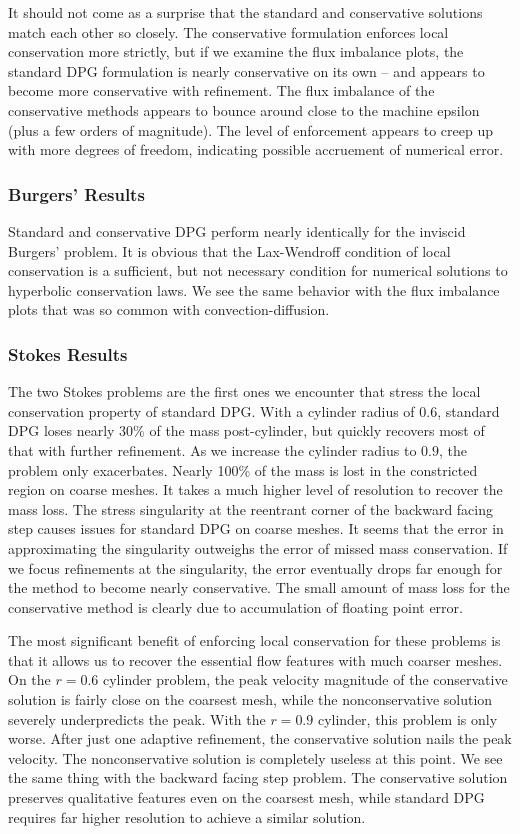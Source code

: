 \documentclass[Proposal.tex]{subfiles}
\begin{document}
It should not come as a surprise that the standard and conservative
solutions match each other so closely. The conservative formulation
enforces local conservation more strictly, but if we examine the flux
imbalance plots, the standard DPG formulation is nearly conservative on its
own -- and appears to become more conservative with refinement. The flux
imbalance of the conservative methods appears to bounce around close to the
machine epsilon (plus a few orders of magnitude). The level of enforcement
appears to creep up with more degrees of freedom, indicating possible
accruement of numerical error.

\subsubsection{Burgers' Results}
Standard and conservative DPG perform nearly identically for the
inviscid Burgers' problem. It is obvious that the Lax-Wendroff condition of
local conservation is a sufficient, but not necessary condition for numerical
solutions to hyperbolic conservation laws. We see the same behavior with the
flux imbalance plots that was so common with convection-diffusion.

\subsubsection{Stokes Results}
The two Stokes problems are the first ones we encounter that stress the local
conservation property of standard DPG. With a cylinder radius of $0.6$,
standard DPG loses nearly 30\% of the mass post-cylinder, but quickly recovers
most of that with further refinement. As we increase the cylinder radius to
$0.9$, the problem only exacerbates. Nearly 100\% of the mass is lost in the
constricted region on coarse meshes. It takes a much higher level of
resolution to recover the mass loss. The stress singularity at the reentrant
corner of the backward facing step causes issues for standard DPG on coarse
meshes. It seems that the error in approximating the singularity outweighs the
error of missed mass conservation. If we focus refinements at the singularity,
the error eventually drops far enough for the method to become nearly
conservative.
The small amount of mass loss for the conservative method is clearly due to
accumulation of floating point error.

The most significant benefit of enforcing local conservation for these
problems is that it allows us to recover the essential flow features with much
coarser meshes. On the $r=0.6$ cylinder problem, the peak velocity magnitude
of the conservative solution is fairly close on the coarsest mesh, while the
nonconservative solution severely underpredicts the peak. With the $r=0.9$
cylinder, this problem is only worse. After just one adaptive
refinement, the conservative solution nails the peak velocity. The
nonconservative solution is completely useless at this point. We see the same
thing with the backward facing step problem. The conservative solution preserves
qualitative features even on the coarsest mesh, while standard DPG requires far higher resolution
to achieve a similar solution. 
\end{document}
